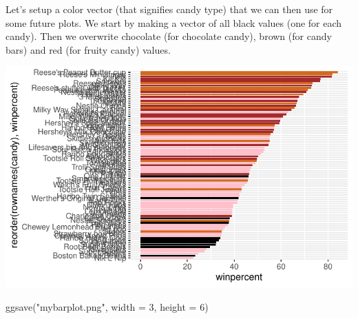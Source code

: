 \documentclass[
  letterpaper,
  DIV=11,
  numbers=noendperiod]{scrartcl}
\newenvironment{Shaded}{\begin{snugshade}}{\end{snugshade}}
\newcommand{\AttributeTok}[1]{\textcolor[rgb]{0.40,0.45,0.13}{#1}}
\newcommand{\DecValTok}[1]{\textcolor[rgb]{0.68,0.00,0.00}{#1}}
\newcommand{\FunctionTok}[1]{\textcolor[rgb]{0.28,0.35,0.67}{#1}}
\newcommand{\NormalTok}[1]{\textcolor[rgb]{0.00,0.23,0.31}{#1}}
\newcommand{\OtherTok}[1]{\textcolor[rgb]{0.00,0.23,0.31}{#1}}
\newcommand{\SpecialCharTok}[1]{\textcolor[rgb]{0.37,0.37,0.37}{#1}}
\newcommand{\StringTok}[1]{\textcolor[rgb]{0.13,0.47,0.30}{#1}}
\begin{document}
Let's setup a color vector (that signifies candy type) that we can then
use for some future plots. We start by making a vector of all black
values (one for each candy). Then we overwrite chocolate (for chocolate
candy), brown (for candy bars) and red (for fruity candy) values.

\begin{Shaded}
\end{Shaded}

\includegraphics{Class09_files/figure-pdf/unnamed-chunk-17-1.pdf}

\begin{Shaded}
\begin{Highlighting}[]
\FunctionTok{ggsave}\NormalTok{(}\StringTok{"mybarplot.png"}\NormalTok{, }\AttributeTok{width =} \DecValTok{3}\NormalTok{, }\AttributeTok{height =} \DecValTok{6}\NormalTok{)}
\end{Highlighting}
\end{Shaded}
\end{document}

